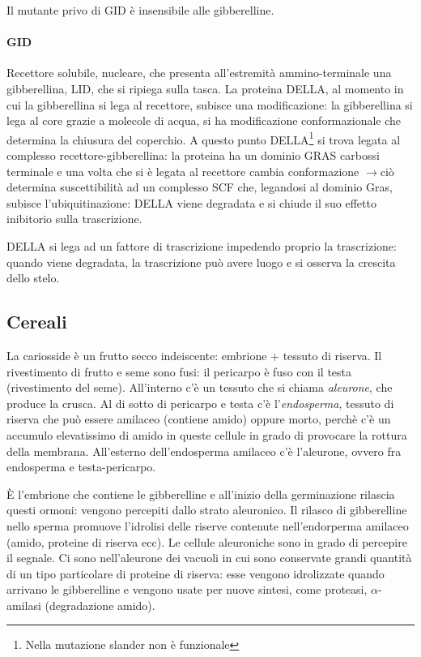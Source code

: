 \documentclass[a4paper,12pt]{book}
\newcommand{\lfreccia}{\ensuremath{\longrightarrow}}
\begin{document}
Il mutante privo di GID è insensibile alle gibberelline.

\paragraph{GID} 
Recettore solubile, nucleare, che presenta all'estremità ammino-terminale una gibberellina, LID, che si ripiega sulla tasca. La proteina DELLA, al momento in cui la gibberellina si lega al recettore, subisce una modificazione: la gibberellina si lega al core grazie a molecole di acqua, si ha modificazione conformazionale che determina la chiusura del coperchio. A questo punto DELLA\footnote{Nella mutazione slander non è funzionale} si trova legata al complesso recettore-gibberellina: la proteina ha un dominio GRAS carbossi terminale e una volta che si è legata al recettore cambia conformazione \lfreccia ciò determina suscettibilità ad un complesso SCF che, legandosi al dominio Gras, subisce l'ubiquitinazione: DELLA viene degradata e si chiude il suo effetto inibitorio sulla trascrizione.


DELLA si lega ad un fattore di trascrizione impedendo proprio la trascrizione: quando viene degradata, la trascrizione può avere luogo e si osserva la crescita dello stelo.

\subsection{Cereali}
La cariosside è un frutto secco indeiscente: embrione + tessuto di riserva. Il rivestimento di frutto e seme sono fusi: il pericarpo è fuso con il testa (rivestimento del seme). All'interno c'è un tessuto che si chiama \emph{aleurone}, che produce la crusca. Al di sotto di pericarpo e testa c'è l'\emph{endosperma}, tessuto di riserva che può essere amilaceo (contiene amido) oppure morto, perchè c'è un accumulo elevatissimo di amido in queste cellule in grado di provocare la rottura della membrana. All'esterno dell'endosperma amilaceo c'è l'aleurone, ovvero fra endosperma e testa-pericarpo.
 
 È l'embrione che contiene le gibberelline e all'inizio della germinazione rilascia questi ormoni: vengono percepiti dallo strato aleuronico. Il rilasco di gibberelline nello sperma promuove l'idrolisi delle riserve contenute nell'endorperma amilaceo (amido, proteine di riserva ecc). Le cellule aleuroniche sono in grado di percepire il segnale. Ci sono nell'aleurone dei vacuoli in cui sono conservate grandi quantità di un tipo particolare di proteine di riserva: esse vengono idrolizzate quando arrivano le gibberelline e vengono usate per nuove sintesi, come proteasi, $\alpha$-amilasi (degradazione amido).
\end{document}
